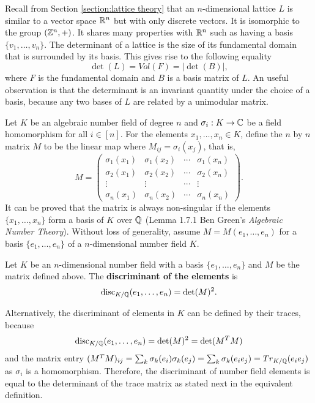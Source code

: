 \documentclass[../main.tex]{subfiles}
\begin{document}
Recall from Section \ref{section:lattice theory} that an $n$-dimensional lattice $L$ is similar to a vector space $\mathbb{R}^n$ but with only discrete vectors. It is isomorphic to the group $(\mathbb{Z}^n,+)$. It shares many properties with $\mathbb{R}^n$ such as having a basis $\{v_1, \dots, v_n\}$. The determinant of a lattice is the size of its fundamental domain that is surrounded by its basis. This gives rise to the following equality 
\begin{equation*}
    \det(L) = Vol(F)=|\det(B)|,
\end{equation*}
where $F$ is the fundamental domain and $B$ is a basis matrix of $L$. An useful observation is that the determinant is an invariant quantity under the choice of a basis, because any two bases of $L$ are related by a unimodular matrix. 
	
Let $K$ be an algebraic number field of degree $n$ and $\sigma_i: K \rightarrow \mathbb{C}$ be a field homomorphism for all $i \in [n]$. For the elements $x_1, \dots, x_n \in K$, define the $n$ by $n$ matrix $M$ to be the linear map where $M_{ij} = \sigma_i(x_j)$, that is,
\begin{equation*}
M = 
\begin{pmatrix}
\sigma_1(x_1) & \sigma_1(x_2) & \cdots & \sigma_1(x_n) \\
\sigma_2(x_1) & \sigma_2(x_2) & \cdots & \sigma_2(x_n) \\
\vdots & \vdots & \cdots & \vdots \\
\sigma_n(x_1) & \sigma_n(x_2) & \cdots & \sigma_n(x_n) 
\end{pmatrix}.
\end{equation*}
It can be proved that the matrix is always non-singular if the elements $\{x_1, \dots, x_n\}$ form a basis of $K$ over $\mathbb{Q}$ (Lemma 1.7.1 Ben Green's \textit{Algebraic Number Theory}). Without loss of generality, assume $M=M(e_1,\dots,e_n)$ for a basis $\{e_1,\dots,e_n\}$ of a $n$-dimensional number field $K$. 


\begin{definition}
Let $K$ be an $n$-dimensional number field with a basis $\{e_1, \dots, e_n\}$ and
\reversemarginpar
{}
$M$ be the matrix defined above. The \textbf{discriminant of the elements} is  
\begin{equation*}
    \text{disc}_{K / \mathbb{Q}}(e_1, \dots, e_n) = \det (M) ^2.
\end{equation*}
\end{definition}

Alternatively, the discriminant of elements in $K$ can be defined by their traces, because 
\begin{align*}
    \text{disc}_{K / \mathbb{Q}}(e_1, \dots, e_n) = \det (M)^2 = \det(M^T M)
\end{align*}
and the matrix entry $(M^T M)_{ij}=\sum_k \sigma_k(e_i) \sigma_k(e_j) = \sum_k \sigma_k(e_i e_j) = Tr_{K / \mathbb{Q}}(e_i e_j)$ as $\sigma_i$ is a homomorphism. Therefore, the discriminant of number field elements is equal to the determinant of the trace matrix as stated next in the equivalent definition. 
\end{document}

